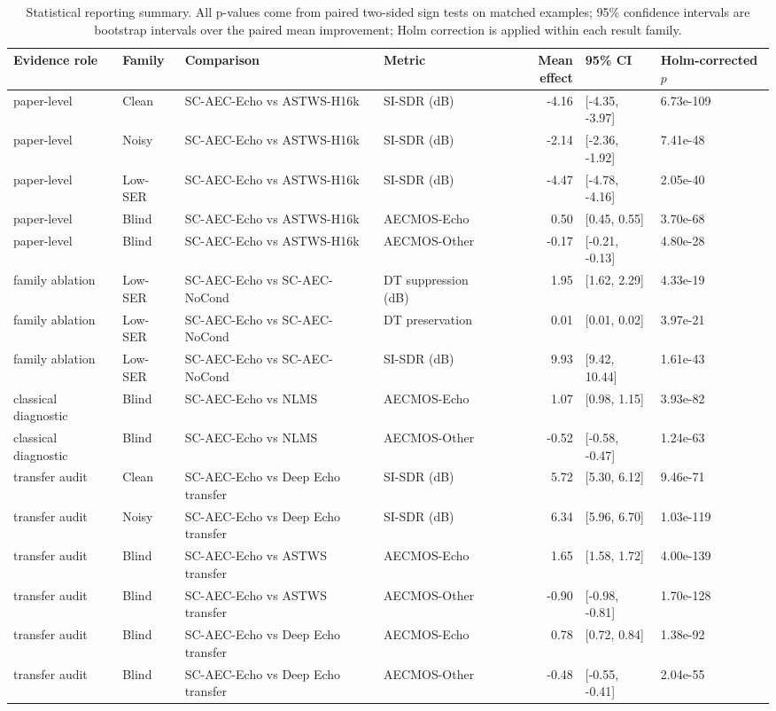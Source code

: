 \begin{table}[t]
\caption{Statistical reporting summary. All p-values come from paired two-sided sign tests on matched examples; 95\% confidence intervals are bootstrap intervals over the paired mean improvement; Holm correction is applied within each result family.}
\label{tab:stats-summary}
\centering
\scriptsize
\begin{tabular}{p{}p{}p{}p{}rll}
\hline
Evidence role & Family & Comparison & Metric & Mean effect & 95\% CI & Holm-corrected $p$ \\
\hline
paper-level & Clean & SC-AEC-Echo vs ASTWS-H16k & SI-SDR (dB) & -4.16 & [-4.35, -3.97] & 6.73e-109 \\
paper-level & Noisy & SC-AEC-Echo vs ASTWS-H16k & SI-SDR (dB) & -2.14 & [-2.36, -1.92] & 7.41e-48 \\
paper-level & Low-SER & SC-AEC-Echo vs ASTWS-H16k & SI-SDR (dB) & -4.47 & [-4.78, -4.16] & 2.05e-40 \\
paper-level & Blind & SC-AEC-Echo vs ASTWS-H16k & AECMOS-Echo & 0.50 & [0.45, 0.55] & 3.70e-68 \\
paper-level & Blind & SC-AEC-Echo vs ASTWS-H16k & AECMOS-Other & -0.17 & [-0.21, -0.13] & 4.80e-28 \\
family ablation & Low-SER & SC-AEC-Echo vs SC-AEC-NoCond & DT suppression (dB) & 1.95 & [1.62, 2.29] & 4.33e-19 \\
family ablation & Low-SER & SC-AEC-Echo vs SC-AEC-NoCond & DT preservation & 0.01 & [0.01, 0.02] & 3.97e-21 \\
family ablation & Low-SER & SC-AEC-Echo vs SC-AEC-NoCond & SI-SDR (dB) & 9.93 & [9.42, 10.44] & 1.61e-43 \\
classical diagnostic & Blind & SC-AEC-Echo vs NLMS & AECMOS-Echo & 1.07 & [0.98, 1.15] & 3.93e-82 \\
classical diagnostic & Blind & SC-AEC-Echo vs NLMS & AECMOS-Other & -0.52 & [-0.58, -0.47] & 1.24e-63 \\
transfer audit & Clean & SC-AEC-Echo vs Deep Echo transfer & SI-SDR (dB) & 5.72 & [5.30, 6.12] & 9.46e-71 \\
transfer audit & Noisy & SC-AEC-Echo vs Deep Echo transfer & SI-SDR (dB) & 6.34 & [5.96, 6.70] & 1.03e-119 \\
transfer audit & Blind & SC-AEC-Echo vs ASTWS transfer & AECMOS-Echo & 1.65 & [1.58, 1.72] & 4.00e-139 \\
transfer audit & Blind & SC-AEC-Echo vs ASTWS transfer & AECMOS-Other & -0.90 & [-0.98, -0.81] & 1.70e-128 \\
transfer audit & Blind & SC-AEC-Echo vs Deep Echo transfer & AECMOS-Echo & 0.78 & [0.72, 0.84] & 1.38e-92 \\
transfer audit & Blind & SC-AEC-Echo vs Deep Echo transfer & AECMOS-Other & -0.48 & [-0.55, -0.41] & 2.04e-55 \\
\hline
\end{tabular}
\end{table}
